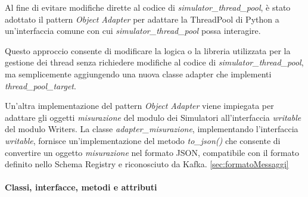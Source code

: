 Al fine di evitare modifiche dirette al codice di \textit{simulator\_thread\_pool}, è stato adottato il pattern \textit{Object Adapter} per adattare la ThreadPool di Python a un'interfaccia comune con cui \textit{simulator\_thread\_pool} possa interagire.

Questo approccio consente di modificare la logica o la libreria utilizzata per la gestione dei thread senza richiedere modifiche al codice di \textit{simulator\_thread\_pool}, ma semplicemente aggiungendo una nuova classe adapter che implementi \textit{thread\_pool\_target}.

Un'altra implementazione del pattern \textit{Object Adapter} viene impiegata per adattare gli oggetti \textit{misurazione} del modulo dei Simulatori all'interfaccia \textit{writable} del modulo Writers. La classe \textit{adapter\_misurazione}, implementando l'interfaccia \textit{writable}, fornisce un'implementazione del metodo \textit{to\_json()} che consente di convertire un oggetto \textit{misurazione} nel formato JSON, compatibile con il formato definito nello Schema Registry e riconosciuto da Kafka.
\ref*{sec:formatoMessaggi}

\paragraph{Classi, interfacce, metodi e attributi}

